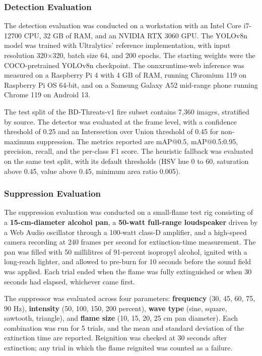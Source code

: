 \subsubsection{Detection Evaluation}

The detection evaluation was conducted on a workstation with an Intel Core i7-12700 CPU, 32 GB of RAM, and an NVIDIA RTX 3060 GPU. The YOLOv8n model was trained with Ultralytics' reference implementation, with input resolution 320$\times$320, batch size 64, and 200 epochs. The starting weights were the COCO-pretrained YOLOv8n checkpoint. The onnxruntime-web inference was measured on a Raspberry Pi 4 with 4 GB of RAM, running Chromium 119 on Raspberry Pi OS 64-bit, and on a Samsung Galaxy A52 mid-range phone running Chrome 119 on Android 13.

The test split of the BD-Threats-v1 fire subset contains 7{,}360 images, stratified by source. The detector was evaluated at the frame level, with a confidence threshold of 0.25 and an Intersection over Union threshold of 0.45 for non-maximum suppression. The metrics reported are mAP@0.5, mAP@0.5:0.95, precision, recall, and the per-class F1 score. The heuristic fallback was evaluated on the same test split, with its default thresholds (HSV hue 0 to 60, saturation above 0.45, value above 0.45, minimum area ratio 0.005).

\subsubsection{Suppression Evaluation}

The suppression evaluation was conducted on a small-flame test rig consisting of a \textbf{15-cm-diameter alcohol pan}, a \textbf{50-watt full-range loudspeaker} driven by a Web Audio oscillator through a 100-watt class-D amplifier, and a high-speed camera recording at 240 frames per second for extinction-time measurement. The pan was filled with 50 millilitres of 91-percent isopropyl alcohol, ignited with a long-reach lighter, and allowed to pre-burn for 10 seconds before the sound field was applied. Each trial ended when the flame was fully extinguished or when 30 seconds had elapsed, whichever came first.

The suppressor was evaluated across four parameters: \textbf{frequency} (30, 45, 60, 75, 90 Hz), \textbf{intensity} (50, 100, 150, 200 percent), \textbf{wave type} (sine, square, sawtooth, triangle), and \textbf{flame size} (10, 15, 20, 25 cm pan diameter). Each combination was run for 5 trials, and the mean and standard deviation of the extinction time are reported. Reignition was checked at 30 seconds after extinction; any trial in which the flame reignited was counted as a failure.

